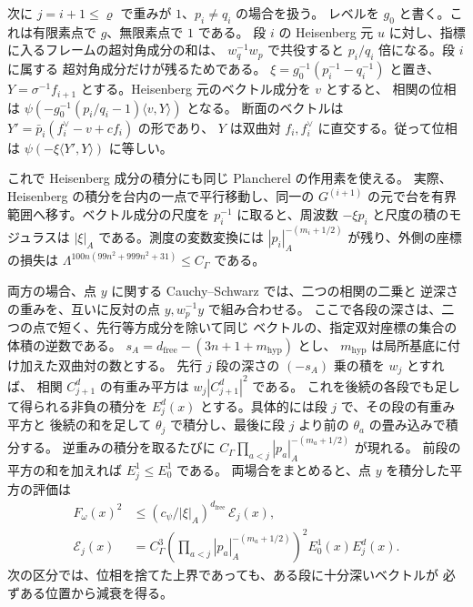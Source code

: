 次に \(j=i+1\le\varrho\) で重みが \(1\)、\(p_i\ne q_i\) の場合を扱う。
レベルを \(g_0\) と書く。これは有限素点で \(g\)、無限素点で \(1\) である。
段 \(i\) の Heisenberg 元 \(u\) に対し、指標に入るフレームの超対角成分の和は、
\(w_q^{-1}w_p\) で共役すると \(p_i/q_i\) 倍になる。段 \(i\) に属する
超対角成分だけが残るためである。
\(\xi=g_0^{-1}(p_i^{-1}-q_i^{-1})\) と置き、
\(Y=\sigma^{-1}f_{i+1}\) とする。Heisenberg 元のベクトル成分を \(v\) とすると、
相関の位相は \(\psi(-g_0^{-1}(p_i/q_i-1)\langle v,Y\rangle)\) となる。
断面のベクトルは \(Y'=\bar p_i(f_i^\vee-v+c f_i)\) の形であり、
\(Y\) は双曲対 \(f_i,f_i^\vee\) に直交する。従って位相は
\(\psi(-\xi\langle Y',Y\rangle)\) に等しい。

これで Heisenberg 成分の積分にも同じ Plancherel の作用素を使える。
実際、Heisenberg の積分を台内の一点で平行移動し、同一の
\(G^{(i+1)}\) の元で台を有界範囲へ移す。ベクトル成分の尺度を
\(p_i^{-1}\) に取ると、周波数 \(-\xi p_i\) と尺度の積のモジュラスは
\(|\xi|_A\) である。測度の変数変換には
\(|p_i|_A^{-(m_i+1/2)}\) が残り、外側の座標の損失は
\(\Lambda^{100n(99n^2+999n^2+31)}\le C_\Gamma\) である。

両方の場合、点 \(y\) に関する Cauchy--Schwarz では、二つの相関の二乗と
逆深さの重みを、互いに反対の点 \(y,w_p^{-1}y\) で組み合わせる。
ここで各段の深さは、二つの点で短く、先行等方成分を除いて同じ
ベクトルの、指定双対座標の集合の体積の逆数である。
\(s_A=d_{\mathrm{free}}-(3n+1+m_\mathrm{hyp})\) とし、
\(m_\mathrm{hyp}\) は局所基底に付け加えた双曲対の数とする。
先行 \(j\) 段の深さの \((-s_A)\) 乗の積を \(w_j\) とすれば、
相関 \(C_{j+1}^d\) の有重み平方は \(w_j|C_{j+1}^d|^2\) である。
これを後続の各段でも足して得られる非負の積分を
\(E_j^d(x)\) とする。具体的には段 \(j\) で、その段の有重み平方と
後続の和を足して \(\theta_j\) で積分し、最後に段 \(j\) より前の
\(\theta_a\) の畳み込みで積分する。
逆重みの積分を取るたびに
\(C_\Gamma\prod_{a<j}|p_a|_A^{-(m_a+1/2)}\) が現れる。
前段の平方の和を加えれば \(E_j^1\le E_0^1\) である。
両場合をまとめると、点 \(y\) を積分した平方の評価は
\begin{equation}\label{eq:span-local-pointwise}
 \begin{split}
 F_\omega(x)^2
 &\le (c_\psi/|\xi|_A)^{d_{\mathrm{free}}}\,\mathcal E_j(x),\\
 \mathcal E_j(x)&=
  C_\Gamma^3\left(\prod_{a<j}|p_a|_A^{-(m_a+1/2)}\right)^2
  E_0^1(x)E_j^d(x).
 \end{split}
\end{equation}
次の区分では、位相を捨てた上界であっても、ある段に十分深いベクトルが
必ずある位置から減衰を得る。

